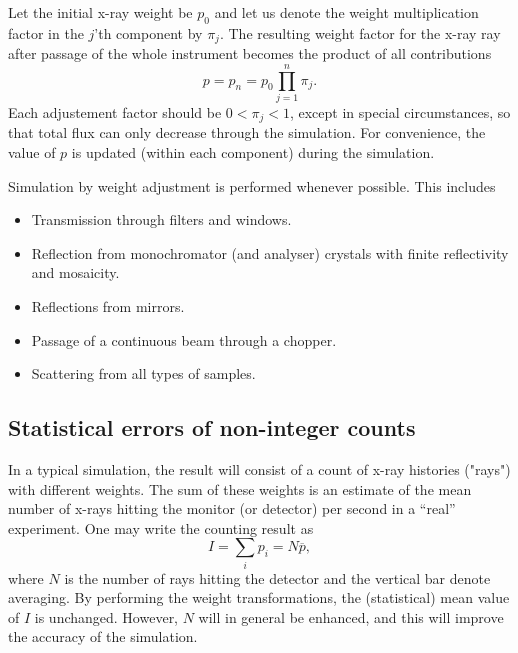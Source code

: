 Let the initial x-ray weight be $p_0$ and let us denote the weight
multiplication factor in the $j$'th component by $\pi_j$.  The resulting
weight factor for the x-ray ray after passage of the whole instrument
becomes the product of all contributions
\begin{equation}
\label{e:probprod}
p = p_n = p_0 \prod_{j=1}^n \pi_j .
\end{equation}
Each adjustement factor should be $0 < \pi_j < 1$, except in special circumstances, so that total flux can only decrease through the simulation. For convenience, the value of $p$ is updated (within each component)
during the simulation.

Simulation by weight adjustment is performed
whenever possible. This includes
\begin{itemize}
\item Transmission through filters and windows.
\item Reflection from monochromator (and analyser) crystals
 with finite reflectivity and mosaicity.
\item Reflections from mirrors.
\item Passage of a continuous beam through a chopper.
\item Scattering from all types of samples.
\end{itemize}

\subsection{Statistical errors of non-integer counts}
\label{s:staterror}

In a typical simulation, the result will consist of a
count of x-ray histories ("rays") with different weights. The
sum of these weights is an estimate of the mean number of x-rays
hitting the monitor (or detector) per second in a ``real'' experiment.
One may write the counting result as
\begin{equation}
\label{psum}
I = \sum_i p_i = N \overline{p} ,
\end{equation}
where $N$ is the number of rays hitting the detector and the vertical bar
denote averaging.
By performing the weight transformations, the (statistical)
mean value of $I$ is unchanged. However, $N$ will in general be enhanced,
and this will improve the accuracy of the simulation.


